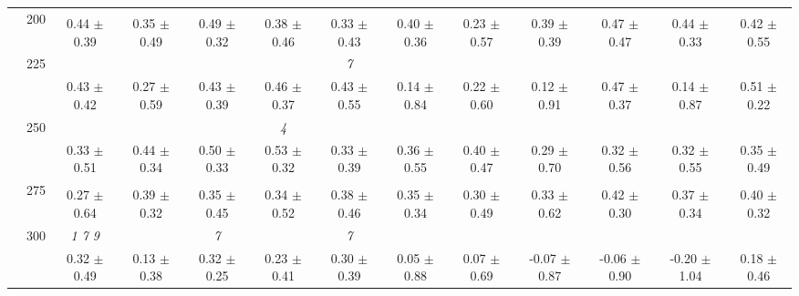 \begin{table}[h]
{\begin{tabular}{
        ccccccccccccc}
 & \multirow{2}{*}{200}& & & & & & & & & & &  \\ 
 & & 0.44 $\pm$ 0.39& 0.35 $\pm$ 0.49& 0.49 $\pm$ 0.32& 0.38 $\pm$ 0.46& 0.33 $\pm$ 0.43& 0.40 $\pm$ 0.36& 0.23 $\pm$ 0.57& 0.39 $\pm$ 0.39& 0.47 $\pm$ 0.47& 0.44 $\pm$ 0.33& 0.42 $\pm$ 0.55 \\ 
 & \multirow{2}{*}{225}& \cellcolor[HTML]{EFEFEF} & \cellcolor[HTML]{EFEFEF} & \cellcolor[HTML]{EFEFEF} & \cellcolor[HTML]{EFEFEF} & \cellcolor[HTML]{EFEFEF} \textit{ 7 }& \cellcolor[HTML]{EFEFEF} & \cellcolor[HTML]{EFEFEF} & \cellcolor[HTML]{EFEFEF} & \cellcolor[HTML]{EFEFEF} & \cellcolor[HTML]{EFEFEF} & \cellcolor[HTML]{EFEFEF}  \\ 
 & & \cellcolor[HTML]{EFEFEF} 0.43 $\pm$ 0.42& \cellcolor[HTML]{EFEFEF} 0.27 $\pm$ 0.59& \cellcolor[HTML]{EFEFEF} 0.43 $\pm$ 0.39& \cellcolor[HTML]{EFEFEF} 0.46 $\pm$ 0.37& \cellcolor[HTML]{EFEFEF} 0.43 $\pm$ 0.55& \cellcolor[HTML]{EFEFEF} 0.14 $\pm$ 0.84& \cellcolor[HTML]{EFEFEF} 0.22 $\pm$ 0.60& \cellcolor[HTML]{EFEFEF} 0.12 $\pm$ 0.91& \cellcolor[HTML]{EFEFEF} 0.47 $\pm$ 0.37& \cellcolor[HTML]{EFEFEF} 0.14 $\pm$ 0.87& \cellcolor[HTML]{EFEFEF} 0.51 $\pm$ 0.22 \\ 
 & \multirow{2}{*}{250}& & & & \textit{ 4 }& & & & & & &  \\ 
 & & 0.33 $\pm$ 0.51& 0.44 $\pm$ 0.34& 0.50 $\pm$ 0.33& 0.53 $\pm$ 0.32& 0.33 $\pm$ 0.39& 0.36 $\pm$ 0.55& 0.40 $\pm$ 0.47& 0.29 $\pm$ 0.70& 0.32 $\pm$ 0.56& 0.32 $\pm$ 0.55& 0.35 $\pm$ 0.49 \\ 
 & \multirow{2}{*}{275}& \cellcolor[HTML]{EFEFEF} & \cellcolor[HTML]{EFEFEF} & \cellcolor[HTML]{EFEFEF} & \cellcolor[HTML]{EFEFEF} & \cellcolor[HTML]{EFEFEF} & \cellcolor[HTML]{EFEFEF} & \cellcolor[HTML]{EFEFEF} & \cellcolor[HTML]{EFEFEF} & \cellcolor[HTML]{EFEFEF} & \cellcolor[HTML]{EFEFEF} & \cellcolor[HTML]{EFEFEF}  \\ 
 & & \cellcolor[HTML]{EFEFEF} 0.27 $\pm$ 0.64& \cellcolor[HTML]{EFEFEF} 0.39 $\pm$ 0.32& \cellcolor[HTML]{EFEFEF} 0.35 $\pm$ 0.45& \cellcolor[HTML]{EFEFEF} 0.34 $\pm$ 0.52& \cellcolor[HTML]{EFEFEF} 0.38 $\pm$ 0.46& \cellcolor[HTML]{EFEFEF} 0.35 $\pm$ 0.34& \cellcolor[HTML]{EFEFEF} 0.30 $\pm$ 0.49& \cellcolor[HTML]{EFEFEF} 0.33 $\pm$ 0.62& \cellcolor[HTML]{EFEFEF} 0.42 $\pm$ 0.30& \cellcolor[HTML]{EFEFEF} 0.37 $\pm$ 0.34& \cellcolor[HTML]{EFEFEF} 0.40 $\pm$ 0.32 \\ 
 & \multirow{2}{*}{300}& \textit{ 1 7 9 }& & \textit{ 7 }& & \textit{ 7 }& & & & & &  \\ 
 & & 0.32 $\pm$ 0.49& 0.13 $\pm$ 0.38& 0.32 $\pm$ 0.25& 0.23 $\pm$ 0.41& 0.30 $\pm$ 0.39& 0.05 $\pm$ 0.88& 0.07 $\pm$ 0.69& -0.07 $\pm$ 0.87& -0.06 $\pm$ 0.90& -0.20 $\pm$ 1.04& 0.18 $\pm$ 0.46 \\ 

\end{tabular}}
\end{table}
